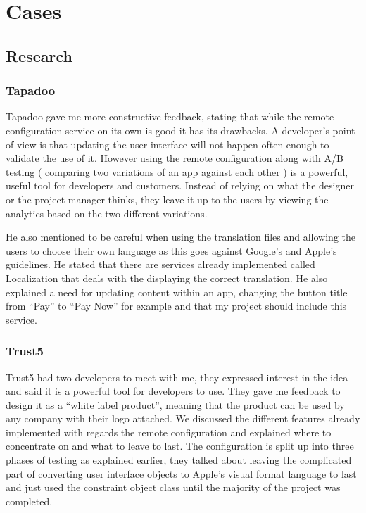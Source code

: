 \chapter{Cases}

\section{Research}

\subsection{Tapadoo}
Tapadoo \cite{tapadoo} gave me more constructive feedback, stating that while the remote configuration service on its own is good it has its drawbacks. A developer's point of view is that updating the user interface will not happen often enough to validate the use of it. However using the remote configuration along with A/B testing ( comparing two variations of an app against each other ) is a powerful, useful tool for developers and customers. Instead of relying on what the designer or the project manager thinks, they leave it up to the users by viewing the analytics based on the two different variations.

He also mentioned to be careful when using the translation files and allowing the users to choose their own language as this goes against Google’s and Apple’s guidelines. He stated that there are services already implemented called Localization that deals with the displaying the correct translation. He also explained a need for updating content within an app, changing the button title from “Pay” to “Pay Now” for example and that my project should include this service.

\subsection{Trust5}

Trust5 \cite{trust5} had two developers to meet with me, they expressed interest in the idea and said it is a powerful tool for developers to use. They gave me feedback to design it as a “white label product”, meaning that the product can be used by any company with their logo attached. We discussed the different features already implemented with regards the remote configuration and explained where to concentrate on and what to leave to last. The configuration is split up into three phases of testing as explained earlier, they talked about leaving the complicated part of converting user interface objects to Apple’s visual format language to last and just used the constraint object class until the majority of the project was completed.

